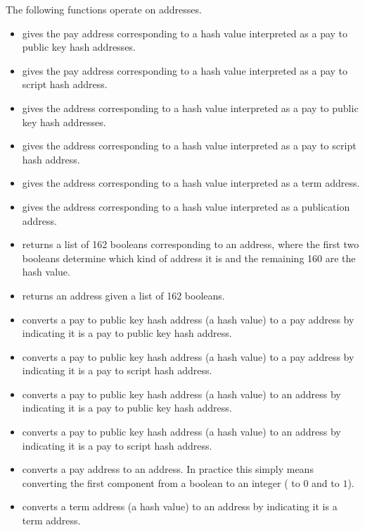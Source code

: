 The following functions operate on addresses.
\begin{itemize}
\item {} gives the pay address corresponding to a hash value interpreted as a pay to public key hash addresses.
\item {} gives the pay address corresponding to a hash value interpreted as a pay to script hash address.
\item {} gives the address corresponding to a hash value interpreted as a pay to public key hash addresses.
\item {} gives the address corresponding to a hash value interpreted as a pay to script hash address.
\item {} gives the address corresponding to a hash value interpreted as a term address.
\item {} gives the address corresponding to a hash value interpreted as a publication address.
\item {} returns a list of 162 booleans corresponding to an address, where the first two booleans determine which kind of address it is and the remaining 160 are the hash value.
\item {} returns an address given a list of 162 booleans.
\item {} converts a pay to public key hash address (a hash value) to a pay address by indicating it is a pay to public key hash address.
\item {} converts a pay to public key hash address (a hash value) to a pay address by indicating it is a pay to script hash address.
\item {} converts a pay to public key hash address (a hash value) to an address by indicating it is a pay to public key hash address.
\item {} converts a pay to public key hash address (a hash value) to an address by indicating it is a pay to script hash address.
\item {} converts a pay address to an address. In practice this simply means converting the first component from a boolean to an integer ({} to $0$ and {} to $1$).
\item {} converts a term address (a hash value) to an address by indicating it is a term address.

\end{itemize}
